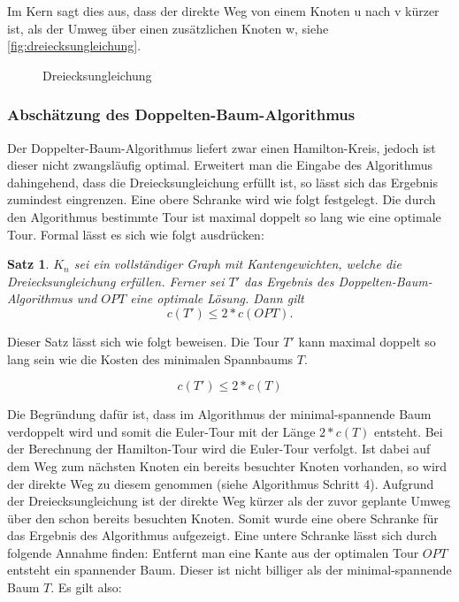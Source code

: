\documentclass{article}
\newtheorem{mysat}{Satz}
\begin{document}
Im Kern sagt dies aus, dass der direkte Weg von einem Knoten u nach v kürzer ist, als der Umweg über einen zusätzlichen Knoten w, siehe \autoref{fig:dreiecksungleichung}.

\begin{figure}[H]
\centering
{}
\caption{Dreiecksungleichung}
\label{fig:dreiecksungleichung}
\end{figure}



\subsubsection{Abschätzung des Doppelten-Baum-Algorithmus}
Der Doppelter-Baum-Algorithmus liefert zwar einen Hamilton-Kreis, jedoch ist dieser nicht zwangsläufig optimal. Erweitert man die Eingabe des Algorithmus dahingehend, dass die Dreiecksungleichung erfüllt ist, so lässt sich das Ergebnis zumindest eingrenzen. Eine obere Schranke wird wie folgt festgelegt. Die durch den Algorithmus bestimmte Tour ist maximal doppelt so lang wie eine optimale Tour. Formal lässt es sich wie folgt ausdrücken:

\begin{mysat}\label{thm:doppelterbaum-obere-grenze}
$K_n$ sei ein vollständiger Graph mit Kantengewichten, welche die Dreiecksungleichung erfüllen. Ferner sei $T'$ das Ergebnis des Doppelten-Baum-Algorithmus und $OPT$ eine optimale Lösung. Dann gilt
\begin{equation}
c(T') \leq 2 * c(OPT).
\label{eq:test}
\end{equation}
\end{mysat}

Dieser Satz lässt sich wie folgt beweisen. Die Tour $T'$ kann maximal doppelt so lang sein wie die Kosten des minimalen Spannbaums $T$.

\begin{equation}
c(T') \leq 2 * c(T)
\end{equation}

Die Begründung dafür ist, dass im Algorithmus der minimal-spannende Baum verdoppelt wird und somit die Euler-Tour mit der Länge $2 * c(T)$ entsteht. Bei der Berechnung der Hamilton-Tour wird die Euler-Tour verfolgt. Ist dabei auf dem Weg zum nächsten Knoten ein bereits besuchter Knoten vorhanden, so wird der direkte Weg zu diesem genommen (siehe Algorithmus Schritt 4). Aufgrund der Dreiecksungleichung ist der direkte Weg kürzer als der zuvor geplante Umweg über den schon bereits besuchten Knoten. Somit wurde eine obere Schranke für das Ergebnis des Algorithmus aufgezeigt. Eine untere Schranke lässt sich durch folgende Annahme finden: Entfernt man eine Kante aus der optimalen Tour $OPT$ entsteht ein spannender Baum. Dieser ist nicht billiger als der minimal-spannende Baum $T$. Es gilt also:
\end{document}
